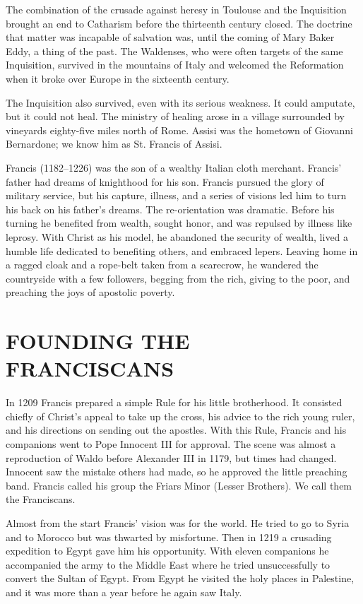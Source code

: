 The combination of the crusade against heresy in Toulouse and the Inquisition brought an end to
Catharism before the thirteenth century closed. The doctrine that matter was incapable of salvation
was, until the coming of Mary Baker Eddy, a thing of the past. The Waldenses, who were often targets
of the same Inquisition, survived in the mountains of Italy and welcomed the Reformation when it
broke over Europe in the sixteenth century.

The Inquisition also survived, even with its serious weakness. It could amputate, but it could not
heal. The ministry of healing arose in a village surrounded by vineyards eighty-five miles north of
Rome. Assisi was the hometown of Giovanni Bernardone; we know him as St. Francis of Assisi.

Francis (1182–1226) was the son of a wealthy Italian cloth merchant. Francis’ father had dreams of
knighthood for his son. Francis pursued the glory of military service, but his capture, illness, and
a series of visions led him to turn his back on his father’s dreams. The re-orientation was
dramatic. Before his turning he benefited from wealth, sought honor, and was repulsed by illness
like leprosy. With Christ as his model, he abandoned the security of wealth, lived a humble life
dedicated to benefiting others, and embraced lepers. Leaving home in a ragged cloak and a rope-belt
taken from a scarecrow, he wandered the countryside with a few followers, begging from the rich,
giving to the poor, and preaching the joys of apostolic poverty.

\section{FOUNDING THE FRANCISCANS}

In 1209 Francis prepared a simple Rule for his little brotherhood. It consisted chiefly of Christ’s
appeal to take up the cross, his advice to the rich young ruler, and his directions on sending out
the apostles. With this Rule, Francis and his companions went to Pope Innocent III for approval. The
scene was almost a reproduction of Waldo before Alexander III in 1179, but times had changed.
Innocent saw the mistake others had made, so he approved the little preaching band. Francis called
his group the Friars Minor (Lesser Brothers). We call them the Franciscans.

Almost from the start Francis’ vision was for the world. He tried to go to Syria and to Morocco but
was thwarted by misfortune. Then in 1219 a crusading expedition to Egypt gave him his opportunity.
With eleven companions he accompanied the army to the Middle East where he tried unsuccessfully to
convert the Sultan of Egypt. From Egypt he visited the holy places in Palestine, and it was more
than a year before he again saw Italy.

